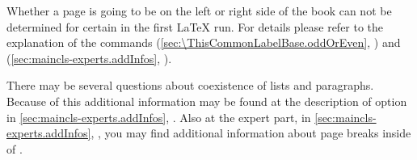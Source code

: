 Whether a page is going to be on the left or right side of the book can not be
determined for certain in the first {\LaTeX} run.  For details please refer to
the explanation of the commands
(\autoref{sec:\ThisCommonLabelBase.oddOrEven},
) and
(\autoref{sec:maincls-experts.addInfos},
).

\begin{Explain}
  There may be several questions about coexistence of lists and
  paragraphs. Because of this additional information may be found at the
  description of option  in
  \autoref{sec:maincls-experts.addInfos},
  . Also at the expert part,
  in \autoref{sec:maincls-experts.addInfos},
  , you may find additional
  information about page breaks inside of .%
\end{Explain}%
%
\EndIndexGroup
%
\EndIndexGroup

